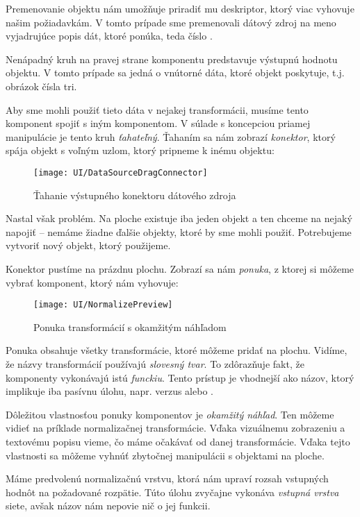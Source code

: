 Premenovanie objektu nám umožňuje priradiť mu deskriptor, ktorý viac vyhovuje našim požiadavkám. V tomto prípade sme premenovali dátový zdroj na meno vyjadrujúce popis dát, ktoré ponúka, teda číslo .

\bigskip

Nenápadný kruh na pravej strane komponentu predstavuje výstupnú hodnotu objektu. V tomto prípade sa jedná o vnútorné dáta, ktoré objekt poskytuje, t.j. obrázok čísla tri.

Aby sme mohli použiť tieto dáta v nejakej transformácii, musíme tento komponent spojiť s iným komponentom. V súlade s koncepciou priamej manipulácie je tento kruh \emph{ťahateľný}. Ťahaním sa nám zobrazí \emph{konektor}, ktorý spája objekt s voľným uzlom, ktorý pripneme k inému objektu:

\begin{figure}[H]
  \centering
  \texttt{[image: UI/DataSourceDragConnector]}
  \caption{Ťahanie výstupného konektoru dátového zdroja}
\end{figure}

Nastal však problém. Na ploche existuje iba jeden objekt a ten chceme na nejaký napojiť -- nemáme žiadne ďalšie objekty, ktoré by sme mohli použiť. Potrebujeme vytvoriť nový objekt, ktorý použijeme.

Konektor pustíme na prázdnu plochu. Zobrazí sa nám \emph{ponuka}, z ktorej si môžeme vybrať komponent, ktorý nám vyhovuje:

\begin{figure}[H]
  \centering
  \texttt{[image: UI/NormalizePreview]}
  \caption{Ponuka transformácií s okamžitým náhľadom}
\end{figure}

Ponuka obsahuje všetky transformácie, ktoré môžeme pridať na plochu. Vidíme, že názvy transformácií používajú \emph{slovesný tvar}. To zdôrazňuje fakt, že komponenty vykonávajú istú \emph{funckiu}. Tento prístup je vhodnejší ako názov, ktorý implikuje iba pasívnu úlohu, napr.  verzus  alebo .

Dôležitou vlastnosťou ponuky komponentov je \emph{okamžitý náhľad}. Ten môžeme vidieť na príklade normalizačnej transformácie. Vďaka vizuálnemu zobrazeniu a textovému popisu vieme, čo máme očakávať od danej transformácie. Vďaka tejto vlastnosti sa môžeme vyhnúť zbytočnej manipulácii s objektami na ploche.

Máme predvolenú normalizačnú vrstvu, ktorá nám upraví rozsah vstupných hodnôt na požadované rozpätie. Túto úlohu zvyčajne vykonáva \emph{vstupná vrstva} siete, avšak názov  nám nepovie nič o jej funkcii.

